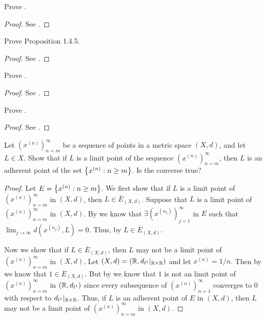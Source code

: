 \begin{ex}\label{ii:ex:1.4.1}
  Prove .
\end{ex}

\begin{proof}
  See .
\end{proof}

\begin{ex}\label{ii:ex:1.4.2}
  Prove Proposition 1.4.5.
\end{ex}

\begin{proof}
  See .
\end{proof}

\begin{ex}\label{ii:ex:1.4.3}
  Prove .
\end{ex}

\begin{proof}
  See .
\end{proof}

\begin{ex}\label{ii:ex:1.4.4}
  Prove .
\end{ex}

\begin{proof}
  See .
\end{proof}

\begin{ex}\label{ii:ex:1.4.5}
  Let \((x^{(n)})_{n = m}^\infty\) be a sequence of points in a metric space \((X, d)\), and let \(L \in X\).
  Show that if \(L\) is a limit point of the sequence \((x^{(n)})_{n = m}^\infty\), then \(L\) is an adherent point of the set \(\left\lbrace x^{(n)} : n \geq m\right\rbrace\).
  Is the converse true?
\end{ex}

\begin{proof}
  Let \(E = \left\lbrace x^{(n)} : n \geq m\right\rbrace\).
  We first show that if \(L\) is a limit point of \((x^{(n)})_{n = m}^\infty\) in \((X, d)\), then \(L \in \overline{E}_{(X, d)}\).
  Suppose that \(L\) is a limit point of \((x^{(n)})_{n = m}^\infty\) in \((X, d)\).
  By  we know that \(\exists (x^{(n_j)})_{j = 1}^\infty\) in \(E\) such that \(\lim_{j \to \infty} d(x^{(n_j)}, L) = 0\).
  Thus, by  \(L \in \overline{E}_{(X, d)}\).

  Now we show that if \(L \in \overline{E}_{(X, d)}\), then \(L\) may not be a limit point of \((x^{(n)})_{n = m}^\infty\) in \((X, d)\).
  Let \((X, d) = (\mathbb{R}, d_{l^1}|_{\mathbb{R} \times \mathbb{R}})\) and let \(x^{(n)} = 1 / n\).
  Then by  we know that \(1 \in \overline{E}_{(X, d)}\).
  But by  we know that \(1\) is not an limit point of \((x^{(n)})_{n = m}^\infty\) in \((\mathbb{R}, d_{l^1})\) since every subsequence of \((x^{(n)})_{n = 1}^\infty\) converges to \(0\) with respect to \(d_{l^1}|_{\mathbb{R} \times \mathbb{R}}\).
  Thus, if \(L\) is an adherent point of \(E\) in \((X, d)\), then \(L\) may not be a limit point of \((x^{(n)})_{n = m}^\infty\) in \((X, d)\).
\end{proof}

